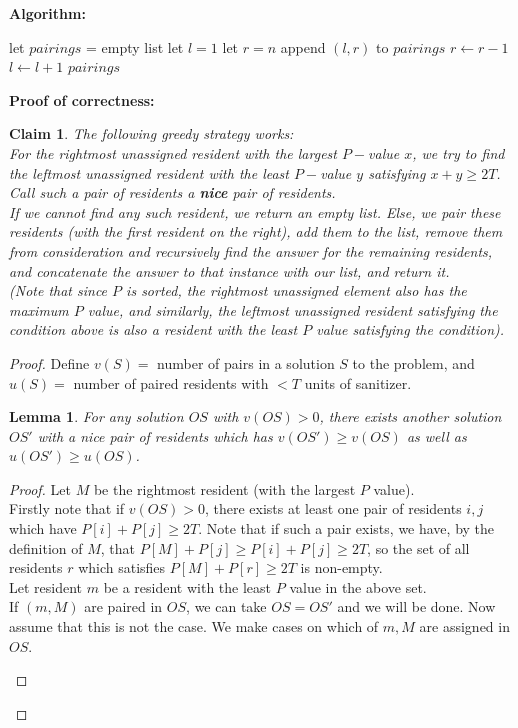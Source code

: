 \documentclass[answers]{exam}
\newtheorem{lemma}{Lemma}
\newtheorem{claim}{Claim}
\newcommand{\nl}{\vspace{0.2cm}\\}
\begin{document}
\begin{questions}
\begin{solution}
\vspace{0.5cm}

\textbf{Algorithm:}


\begin{algorithmic}[1]
        \State let $\mathit{pairings}$ = empty list
        \State let $l = 1$
        \State let $r = n$
                \State append $(l, r)$ to $\mathit{pairings}$
                \State $r \gets r - 1$
            \EndIf
            \State $l \gets l + 1$
        \EndWhile
        \State \Return $\mathit{pairings}$
    \EndFunction
\end{algorithmic}

\vspace{0.5cm}

\textbf{Proof of correctness:}

\begin{claim}
The following greedy strategy works:\nl
For the rightmost unassigned resident with the largest $P-$value $x$, we try to find the leftmost unassigned resident with the least $P-$value $y$ satisfying $x + y \ge 2T$. Call such a pair of residents a \textbf{nice} pair of residents.\\
If we cannot find any such resident, we return an empty list. Else, we pair these residents (with the first resident on the right), add them to the list, remove them from consideration and recursively find the answer for the remaining residents, and concatenate the answer to that instance with our list, and return it.\\
(Note that since $P$ is sorted, the rightmost unassigned element also has the maximum $P$ value, and similarly, the leftmost unassigned resident satisfying the condition above is also a resident with the least $P$ value satisfying the condition).
\end{claim}
\begin{proof}
Define $v(S) =$ number of pairs in a solution $S$ to the problem, and $u(S) =$ number of paired residents with $< T$ units of sanitizer.
\begin{lemma}
For any solution $OS$ with $v(OS) > 0$, there exists another solution $OS'$ with a nice pair of residents which has $v(OS') \ge v(OS)$ as well as $u(OS') \ge u(OS)$.
\end{lemma}
\begin{proof}
Let $M$ be the rightmost resident (with the largest $P$ value).\nl
Firstly note that if $v(OS) > 0$, there exists at least one pair of residents $i, j$ which have $P[i] + P[j] \ge 2T$. Note that if such a pair exists, we have, by the definition of $M$, that $P[M] + P[j] \ge P[i] + P[j] \ge 2T$, so the set of all residents $r$ which satisfies $P[M] + P[r] \ge 2T$ is non-empty.\nl
Let resident $m$ be a resident with the least $P$ value in the above set.\nl
If $(m, M)$ are paired in $OS$, we can take $OS = OS'$ and we will be done. Now assume that this is not the case. We make cases on which of $m, M$ are assigned in $OS$.
\begin{enumerate}
    

\end{enumerate}
\end{proof}
\end{proof}
\end{solution}
\end{questions}
\end{document}
